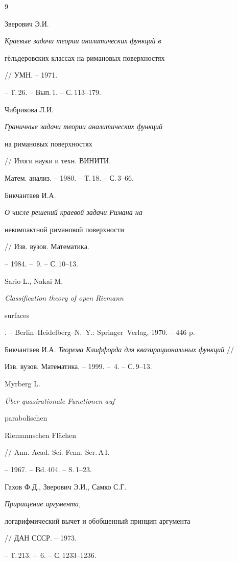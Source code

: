 \begin{thebibliography}{9}







Зверович Э.И. {\em Краевые задачи теории аналитических функций в


г\"ельдеровских классах на римановых поверхностях} // УМН. -- 1971.


-- Т.\,26. -- Вып.\,1. -- С.\,113--179.




Чибрикова Л.И. {\em Граничные задачи теории аналитических функций


на римановых поверхностях} // Итоги науки и техн. ВИНИТИ.


Матем. анализ. -- 1980. -- Т.\,18. -- С.\,3--66.




Бикчантаев И.А. {\em О числе решений краевой задачи Римана на


некомпактной римановой поверхности} // Изв. вузов. Математика.


-- 1984. -- \No\,9. -- С.\,10--13.




Sario L., Nakai M. {\em Classification theory of open Riemann


surfaces}. -- Berlin--Heidelberg--N.~Y.: Springer~Verlag, 1970. -- 446 p.




Бикчантаев И.А. {\em Теорема Клиффорда для квазирациональных функций} //


Изв. вузов. Математика. -- 1999. -- \No\,4. -- С.\,9--13.




Myrberg L. {\em \"Uber quasirationale Functionen auf


pa\-ra\-bo\-li\-schen


Riemannschen Fl\"a\-chen} // Ann. Acad. Sci. Fenn. Ser.\,A\,I.


-- 1967. -- Bd.\,404. -- S.\,1--23.




Гахов Ф.Д., Зверович Э.И., Самко С.Г. {\em Приращение аргумента,


логарифмический вычет и обобщенный принцип аргумента} // ДАН СССР. -- 1973.


-- Т.\,213. -- \No\,6. -- С.\,1233--1236.





\end{thebibliography}





\vskip 2cm












\label{end}





